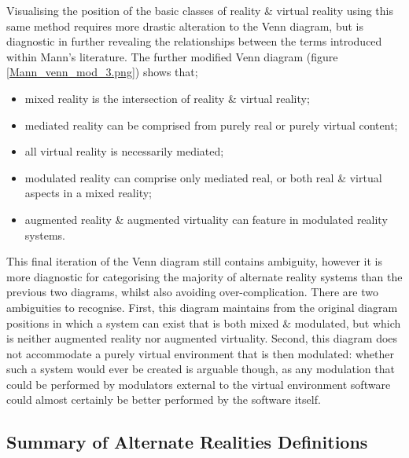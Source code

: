 Visualising the position of the basic classes of reality \& virtual reality using this same method requires more drastic alteration to the Venn diagram, but is diagnostic in further revealing the relationships between the terms introduced within Mann's literature. The further modified Venn diagram (figure \ref{Mann_venn_mod_3.png}) shows that;
\begin{itemize}
	\item mixed reality is the intersection of reality \& virtual reality;
	\item mediated reality can be comprised from purely real or purely virtual content;
	\item all virtual reality is necessarily mediated;
	\item modulated reality can comprise only mediated real, or both real \& virtual aspects in a mixed reality;
	\item augmented reality \& augmented virtuality can feature in modulated reality systems.
\end{itemize}

This final iteration of the Venn diagram still contains ambiguity, however it is more diagnostic for categorising the majority of alternate reality systems than the previous two diagrams, whilst also avoiding over-complication. There are two ambiguities to recognise. First, this diagram maintains from the original diagram positions in which a system can exist that is both mixed \& modulated, but which is neither augmented reality nor augmented virtuality. Second, this diagram does not accommodate a purely virtual environment that is then modulated: whether such a system would ever be created is arguable though, as any modulation that could be performed by modulators external to the virtual environment software could almost certainly be better performed by the software itself.


\clearpage

\subsection{Summary of Alternate Realities Definitions}
\label{summaryofalternaterealitydefinitions}

